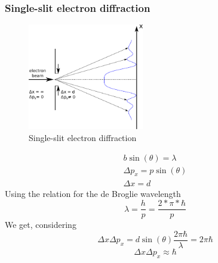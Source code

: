 		\subsubsection{Single-slit electron diffraction}
			\begin{figure}[!h]
				\centering
				\includegraphics[width=0.45\textwidth]{./figs/ElectronDiffraction.eps}
				\caption{Single-slit electron diffraction}
				\label{electrondiffrac}
			\end{figure}
			
			\begin{align}
				b \sin(\theta) = \lambda \\
				\Delta p_x = p \sin(\theta) \\
				\Delta x = d
			\end{align}
			Using the relation for the de Broglie wavelength
			\begin{equation}
				\lambda = \frac{h}{p} = \frac{2*\pi *\hbar}{p}
			\end{equation}
			We get, considering
			\begin{equation}
				\Delta x \Delta p_x = d \sin(\theta) \frac{2\pi\hbar}{\lambda} = 2 \pi \hbar
			\end{equation}
			\begin{equation}
				\Delta x \Delta p_x \approx \hbar
			\end{equation}
			
